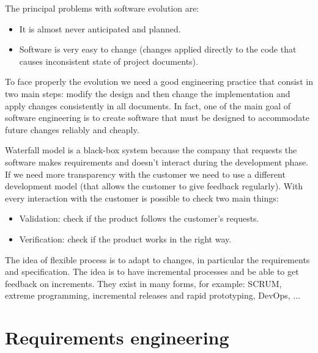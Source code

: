 \documentclass[12pt, a4paper]{report}
\begin{document}
    The principal problems with software evolution are:
    \begin{itemize}
        \item It is almost never anticipated and planned.
        \item Software is very easy to change (changes applied directly to the code that causes inconsistent state of project documents).
    \end{itemize}
    To face properly the evolution we need a good engineering practice that consist in two main steps: modify the design and then change 
    the implementation and apply changes consistently in all documents. In fact, one of the main goal of software engineering is to create 
    software that must be designed to accommodate future changes reliably and cheaply. 
    
    Waterfall model is a black-box system because the company that requests the software makes requirements and doesn't interact during 
    the development phase. If we need more transparency with the customer we need to use a different development model (that allows the 
    customer to give feedback regularly). With every interaction with the customer is possible to check two main things:
    \begin{itemize}
        \item Validation: check if the product follows the customer's requests.
        \item Verification: check if the product works in the right way.
    \end{itemize}
    
    The idea of flexible process is to adapt to changes, in particular the requirements and specification. The idea is to have incremental 
    processes and be able to get feedback on increments. They exist in many forms, for example: SCRUM, extreme programming, incremental 
    releases and rapid prototyping, DevOps, $\dots$
    
\newpage

\chapter{Requirements engineering}
\end{document}
